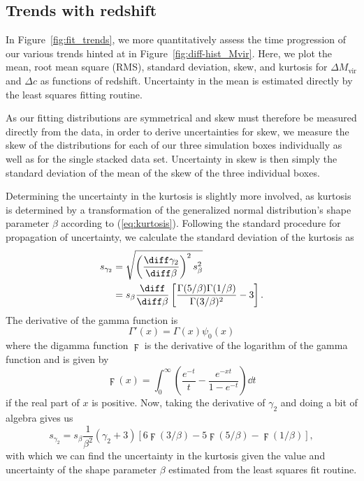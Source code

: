 \subsection{Trends with redshift}

In Figure~\ref{fig:fit_trends}, we more quantitatively assess the time progression of our various trends hinted at in Figure~\ref{fig:diff-hist_Mvir}.  Here, we plot the mean, root mean square (RMS), standard deviation, skew, and kurtosis for $\Delta M_{\mathrm{vir}}$ and $\Delta c$ as functions of redshift.  Uncertainty in the mean is estimated directly by the least squares fitting routine.

As our fitting distributions are symmetrical and skew must therefore be measured directly from the data, in order to derive uncertainties for skew, we measure the skew of the distributions for each of our three simulation boxes individually as well as for the single stacked data set.  Uncertainty in skew is then simply the standard deviation of the mean of the skew of the three individual boxes.

Determining the uncertainty in the kurtosis is slightly more involved, as kurtosis is determined by a transformation of the generalized normal distribution's shape parameter $\beta$ according to (\ref{eq:kurtosis}).  Following the standard procedure for propagation of uncertainty, we calculate the standard deviation of the kurtosis as
\begin{align} \label{eq:kurt_err_partial}
    s_{\gamma_{2}} &= \sqrt{ \left( \frac{\diff \gamma_{2}}{\diff \beta} \right)^{2} s_{\beta}^{2} } \\
        &= s_{\beta} \frac{\diff}{\diff \beta} \left[ \frac{\Gamma(5/\beta) \Gamma(1/\beta)}{\Gamma(3/\beta)^{2}} - 3 \right].
\end{align}
The derivative of the gamma function is
\begin{equation} \label{eq:gamma_prime}
    \Gamma'(x) = \Gamma(x) \psi_{0}(x)
\end{equation}
where the digamma function $\digamma$ is the derivative of the logarithm of the gamma function and is given by
\begin{equation} \label{eq:digamma}
    \digamma(x) = \int_{0}^{\infty} \left( \frac{e^{-t}}{t} - \frac{e^{-xt}}{1 - e^{-t}} \right) \dd t
\end{equation}
if the real part of $x$ is positive.  Now, taking the derivative of $\gamma_{2}$ and doing a bit of algebra gives us
\begin{equation} \label{eq:kurt_err}
    s_{\gamma_{2}} = s_{\beta} \frac{1}{\beta^{2}} \left( \gamma_{2} + 3 \right) \left[ 6 \digamma(3/\beta) - 5 \digamma(5/\beta) - \digamma(1/\beta) \right],
\end{equation}
with which we can find the uncertainty in the kurtosis given the value and uncertainty of the shape parameter $\beta$ estimated from the least squares fit routine.

